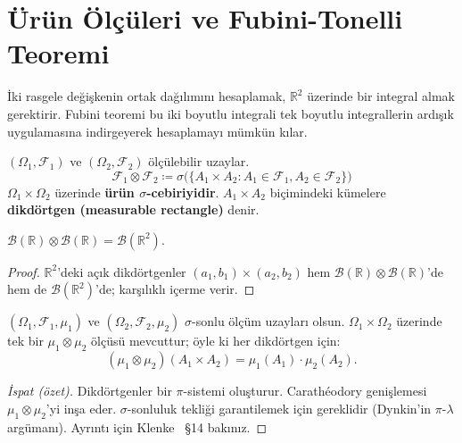 \section{Ürün Ölçüleri ve Fubini-Tonelli Teoremi}

\begin{motivasyon}[§1.8]
İki rasgele değişkenin ortak dağılımını hesaplamak, $\mathbb{R}^2$ üzerinde
bir integral almak gerektirir. Fubini teoremi bu iki boyutlu integrali
tek boyutlu integrallerin ardışık uygulamasına indirgeyerek hesaplamayı
mümkün kılar.
\end{motivasyon}

\begin{tanim}\label{def:urun_sigma}
$(\Omega_1, \mathcal{F}_1)$ ve $(\Omega_2, \mathcal{F}_2)$ ölçülebilir uzaylar.
\[
  \mathcal{F}_1 \otimes \mathcal{F}_2 \coloneqq
  \sigma\bigl(\{A_1 \times A_2 : A_1 \in \mathcal{F}_1, A_2 \in \mathcal{F}_2\}\bigr)
\]
$\Omega_1 \times \Omega_2$ üzerinde \textbf{ürün $\sigma$-cebiriyidir}.
$A_1 \times A_2$ biçimindeki kümelere \textbf{dikdörtgen (measurable rectangle)} denir.
\end{tanim}

\begin{onerme}
$\mathcal{B}(\mathbb{R}) \otimes \mathcal{B}(\mathbb{R}) = \mathcal{B}(\mathbb{R}^2)$.
\end{onerme}

\begin{proof}
$\mathbb{R}^2$'deki açık dikdörtgenler $(a_1,b_1) \times (a_2,b_2)$ hem
$\mathcal{B}(\mathbb{R}) \otimes \mathcal{B}(\mathbb{R})$'de hem de
$\mathcal{B}(\mathbb{R}^2)$'de; karşılıklı içerme verir.
\end{proof}

\begin{teorem}\label{thm:urunoelcu}
$(\Omega_1, \mathcal{F}_1, \mu_1)$ ve $(\Omega_2, \mathcal{F}_2, \mu_2)$ $\sigma$-sonlu
ölçüm uzayları olsun. $\Omega_1 \times \Omega_2$ üzerinde tek bir $\mu_1 \otimes \mu_2$
ölçüsü mevcuttur; öyle ki her dikdörtgen için:
\[
  (\mu_1 \otimes \mu_2)(A_1 \times A_2) = \mu_1(A_1) \cdot \mu_2(A_2).
\]
\end{teorem}

\begin{proof}[İspat (özet)]
Dikdörtgenler bir $\pi$-sistemi oluşturur. Carathéodory genişlemesi
$\mu_1 \otimes \mu_2$'yi inşa eder. $\sigma$-sonluluk tekliği garantilemek
için gereklidir (Dynkin'in $\pi$-$\lambda$ argümanı).
Ayrıntı için Klenke~\cite{klenke2014} §14 bakınız.
\end{proof}

